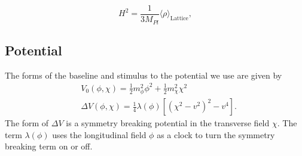 
\begin{equation} \label{eq:energy constraint}
  H^2 = \frac{1}{3M_{Pl}}\langle \rho \rangle_{\mathrm{Lattice}},
\end{equation} 


\subsection{Potential}
\Fpotential


The forms of the baseline and stimulus to the potential we use are given by
\begin{align} \label{eq:potential}
  &V_0(\phi,\chi) = \frac{1}{2}m^2_\phi\phi^2 + \frac{1}{2}m^2_\chi\chi^2 \\
  &\Delta V(\phi,\chi) = \frac{1}{4}\lambda(\phi)\left[ (\chi^2-v^2)^2 - v^4 \right].
\end{align}
The form of $\Delta V$ is a symmetry breaking potential in the transverse field $\chi$. The term $\lambda(\phi)$ uses the longitudinal field $\phi$ as a clock to turn the symmetry breaking term on or off.

